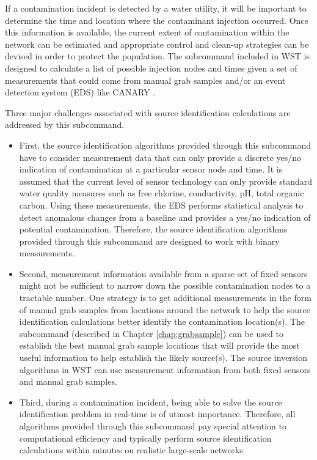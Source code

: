 If a contamination incident is detected by a water utility, it will be
important to determine the time and location where the contaminant
injection occurred. Once this information is available, the current
extent of contamination within the network can be estimated and
appropriate control and clean-up strategies can be devised in order to
protect the population. The  subcommand included in
WST is designed to calculate a list of possible injection nodes and
times given a set of measurements that could come from manual grab
samples and/or an event detection system (EDS) like CANARY \citep{CANARY}.

Three major challenges associated with source identification
calculations are addressed by this subcommand.  
\begin{itemize}
\item First, the source
identification algorithms provided through this subcommand have to
consider measurement data that can only provide a discrete yes/no
indication of contamination at a particular sensor node and time. 
It is assumed that the current level of sensor technology can only provide
standard water quality measures such as free chlorine, conductivity,
pH, total organic carbon. Using these measurements, the EDS performs statistical
analysis to detect anomalous changes from a baseline and
provides a yes/no indication of potential contamination. Therefore,
the source identification algorithms provided through this subcommand
are designed to work with binary measurements.  
\item Second, measurement
information available from a sparse set of fixed sensors might not be
sufficient to narrow down the possible contamination nodes to a
tractable number. One strategy is to get additional measurements in
the form of manual grab samples from locations around the network to
help the source identification calculations better identify the
contamination location(s). 
The  subcommand (described in Chapter \ref{chap:grabsample})
can be used to establish the best manual grab sample locations that will
provide the most useful information to help establish the likely 
source(s).
The source
inversion algorithms in WST can use measurement information from both
fixed sensors and manual grab samples.
\item Third, during a contamination incident, being able to solve
the source identification problem in real-time is of utmost importance.
Therefore, all algorithms provided through this subcommand pay special 
attention to computational efficiency and typically perform source identification 
calculations within minutes on realistic large-scale networks.
\end{itemize}   
